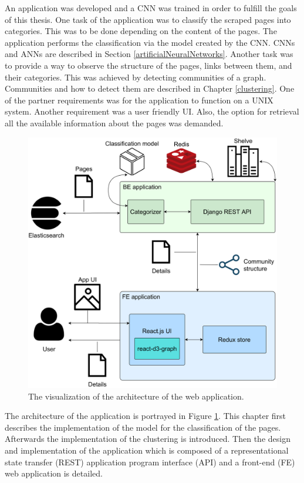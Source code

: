 \label{developmentIntroduction}
An application was developed and a CNN was trained in order to fulfill the goals of this thesis. One task of the application was to classify the scraped pages into categories. This was to be done depending on the content of the pages. The application performs the classification via the model created by the CNN. CNNs and ANNs are described in Section \ref{artificialNeuralNetworks}. Another task was to provide a way to observe the structure of the pages, links between them, and their categories. This was achieved by detecting communities of a graph. Communities and how to detect them are described in Chapter \ref{clustering}. One of the partner requirements was for the application to function on a UNIX system. Another requirement was a user friendly UI. Also, the option for retrieval all the available information about the pages was demanded. 

\begin{figure}[ht!]
  \centering
  \includegraphics[width = \textwidth]{Images/ApplicationArchitecture.png}
  \caption{The visualization of the architecture of the web application.}
  \label{ApplicationArchitecture}
\end{figure}

The architecture of the application is portrayed in Figure \ref{ApplicationArchitecture}. This chapter first describes the implementation of the model for the classification of the pages. Afterwards the implementation of the clustering is introduced. Then the design and implementation of the application which is composed of a representational state transfer (REST) application program interface (API) and a front-end (FE) web application is detailed. 

